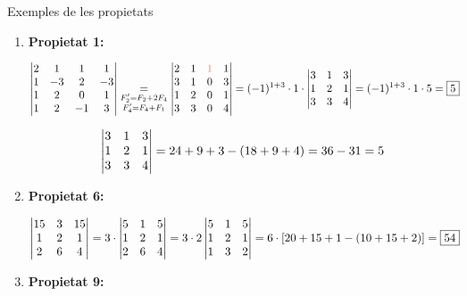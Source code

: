 \documentclass[11pt,a4paper]{article}
\newcommand{\fmdisp}[1]{\[\setbox2=\hbox{$\displaystyle #1$}\ifdim\wd2>\linewidth\resizebox{\linewidth}{!}{\box2}\else\box2\fi\]}
\begin{document}
\begin{fmex}{Exemples de les propietats}
\begin{enumerate}[label=\textbf{\arabic*.},leftmargin=*]
\item \textbf{Propietat 1:}

\fmdisp{\begin{vmatrix}2 & 1 & 1 & 1\\ 1 & -3 & 2 & -3\\ 1 & 2 & 0 & 1\\ 1 & 2 & -1 & 3\end{vmatrix}\underset{\substack{F_2'=F_2+2F_4\\ F_4'=F_4+F_1}}{=}\begin{vmatrix}2 & 1 & \color[HTML]{ff7a50}1 & 1\\ 3 & 1 & 0 & 3\\ 1 & 2 & 0 & 1\\ 3 & 3 & 0 & 4\end{vmatrix}=(-1)^{1+3}\cdot1\cdot\begin{vmatrix}3 & 1 & 3\\ 1 & 2 & 1\\ 3 & 3 & 4\end{vmatrix}=(-1)^{1+3}\cdot1\cdot5=\boxed{5}}

\fmdisp{\begin{vmatrix}3 & 1 & 3\\ 1 & 2 & 1\\ 3 & 3 & 4\end{vmatrix}=24+9+3-(18+9+4)=36-31=5}

\item \textbf{Propietat 6:}

\fmdisp{\begin{vmatrix}15 & 3 & 15\\ 1 & 2 & 1\\ 2 & 6 & 4\end{vmatrix}=3\cdot\begin{vmatrix}5 & 1 & 5\\ 1 & 2 & 1\\ 2 & 6 & 4\end{vmatrix}=3\cdot2\begin{vmatrix}5 & 1 & 5\\ 1 & 2 & 1\\ 1 & 3 & 2\end{vmatrix}=6\cdot[20+15+1-(10+15+2)]=\boxed{54}}

\item \textbf{Propietat 9:}


\end{enumerate}
\end{fmex}
\end{document}
